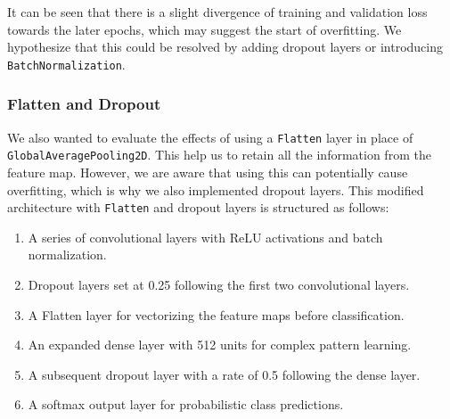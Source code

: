 It can be seen that there is a slight divergence of training and validation loss towards the later epochs, which may suggest the start of overfitting. We hypothesize that this could be resolved by adding dropout layers or introducing \texttt{BatchNormalization}.

\subsubsection{Flatten and Dropout}

We also wanted to evaluate the effects of using a \texttt{Flatten} layer in place of \texttt{GlobalAveragePooling2D}. This help us to retain all the information from the feature map. However, we are aware that using this can potentially cause overfitting, which is why we also implemented dropout layers. This modified architecture with \texttt{Flatten} and dropout layers is structured as follows:

\begin{enumerate}
  \item A series of convolutional layers with ReLU activations and batch normalization.
  \item Dropout layers set at 0.25 following the first two convolutional layers.
  \item A Flatten layer for vectorizing the feature maps before classification.
  \item An expanded dense layer with 512 units for complex pattern learning.
  \item A subsequent dropout layer with a rate of 0.5 following the dense layer.
  \item A softmax output layer for probabilistic class predictions.
\end{enumerate}

